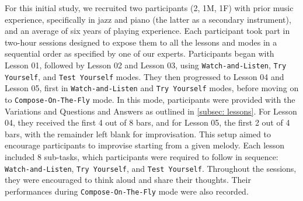 \documentclass{vgtc}                          %
\begin{document}
\par %
For this initial study, we recruited two participants (2, 1M, 1F) with prior music experience, specifically in jazz and piano (the latter as a secondary instrument), and an average of six years of playing experience. Each participant took part in two-hour sessions designed to expose them to all the lessons and modes in a sequential order as specified by one of our experts. Participants began with Lesson 01, followed by Lesson 02 and Lesson 03, using \texttt{Watch-and-Listen}, \texttt{Try Yourself}, and \texttt{Test Yourself} modes. They then progressed to Lesson 04 and Lesson 05, first in \texttt{Watch-and-Listen} and \texttt{Try Yourself} modes, before moving on to \texttt{Compose-On-The-Fly} mode. In this mode, participants were provided with the Variations and Questions and Answers as outlined in \autoref{subsec: lessons}. For Lesson 04, they received the first 4 out of 8 bars, and for Lesson 05, the first 2 out of 4 bars, with the remainder left blank for improvisation. This setup aimed to encourage participants to improvise starting from a given melody. Each lesson included 8 sub-tasks, which participants were required to follow in sequence: \texttt{Watch-and-Listen}, \texttt{Try Yourself}, and \texttt{Test Yourself}. Throughout the sessions, they were encouraged to think aloud and share their thoughts. Their performances during \texttt{Compose-On-The-Fly} mode were also recorded.
\end{document}
